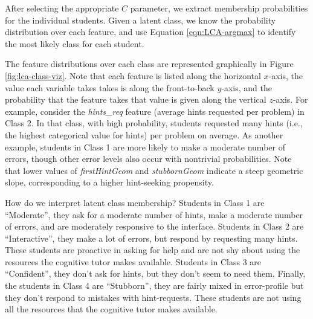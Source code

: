 \documentclass{edm_template}
\begin{document}
After selecting the appropriate $C$ parameter, we extract membership probabilities for the individual students. Given a latent class, we know the probability distribution over each feature, and use Equation \ref{eqn:LCA-argmax} to identify the most likely class for each student.

The feature distributions over each class are represented graphically in Figure \ref{fig:lca-class-viz}. Note that each feature is listed along the horizontal $x$-axis, the value each variable takes takes is along the front-to-back $y$-axis, and the probability that the feature takes that value is given along the vertical $z$-axis. For example, consider the \emph{hints\_req} feature (average hints requested per problem) in Class 2. In that class, with high probability, students requested many hints (i.e., the highest categorical value for hints) per problem on average. As another example, students in Class 1 are more likely to make a moderate number of errors, though other error levels also occur with nontrivial probabilities. Note that lower values of \emph{firstHintGeom} and \emph{stubbornGeom} indicate a steep geometric slope, corresponding to a higher hint-seeking propensity.

How do we interpret latent class membership? Students in Class 1 are ``Moderate'', they ask for a moderate number of hints, make a moderate number of errors, and are moderately responsive to the interface. Students in Class 2 are ``Interactive'', they make a lot of errors, but respond by requesting many hints. These students are proactive in asking for help and are not shy about using the resources the cognitive tutor makes available. Students in Class 3 are ``Confident'', they don't ask for hints, but they don't seem to need them. Finally, the students in Class 4 are ``Stubborn'', they are fairly mixed in error-profile but they don't respond to mistakes with hint-requests. These students are not using all the resources that the cognitive tutor makes available.
\end{document}
